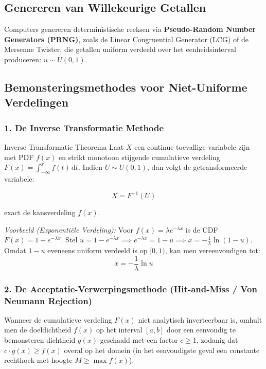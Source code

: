 \documentclass[11pt,a4paper]{article}
\newcommand{\dd}{\mathrm{d}}
\begin{document}
\subsection{Genereren van Willekeurige Getallen}
Computers genereren deterministische reeksen via \textbf{Pseudo-Random Number Generators (PRNG)}, zoals de Linear Congruential Generator (LCG) of de Mersenne Twister, die getallen uniform verdeeld over het eenheidsinterval produceren: $u \sim U(0, 1)$.

\subsection{Bemonsteringsmethodes voor Niet-Uniforme Verdelingen}
\subsubsection{1. De Inverse Transformatie Methode}
\begin{theobox}{Inverse Transformatie Theorema}
Laat $X$ een continue toevallige variabele zijn met PDF $f(x)$ en strikt monotoon stijgende cumulatieve verdeling $F(x) = \int_{-\infty}^x f(t) \, \dd t$.
Indien $U \sim U(0, 1)$, dan volgt de getransformeerde variabele:
\begin{formulabox}
\begin{equation}
    X = F^{-1}(U)
\end{equation}
\end{formulabox}
exact de kansverdeling $f(x)$.
\end{theobox}

\emph{Voorbeeld (Exponentiële Verdeling):}
Voor $f(x) = \lambda e^{-\lambda x}$ is de CDF $F(x) = 1 - e^{-\lambda x}$.
Stel $u = 1 - e^{-\lambda x} \implies e^{-\lambda x} = 1 - u \implies x = -\frac{1}{\lambda} \ln(1 - u)$.
Omdat $1 - u$ eveneens uniform verdeeld is op $[0, 1)$, kan men vereenvoudigen tot:
\begin{equation}
    x = -\frac{1}{\lambda} \ln u
\end{equation}

\subsubsection{2. De Acceptatie-Verwerpingsmethode (Hit-and-Miss / Von Neumann Rejection)}
Wanneer de cumulatieve verdeling $F(x)$ niet analytisch inverteerbaar is, omhult men de doeldichtheid $f(x)$ op het interval $[a, b]$ door een eenvoudig te bemonsteren dichtheid $g(x)$ geschaald met een factor $c \ge 1$, zodanig dat $c \cdot g(x) \ge f(x)$ overal op het domein (in het eenvoudigste geval een constante rechthoek met hoogte $M \ge \max f(x)$).
\end{document}
